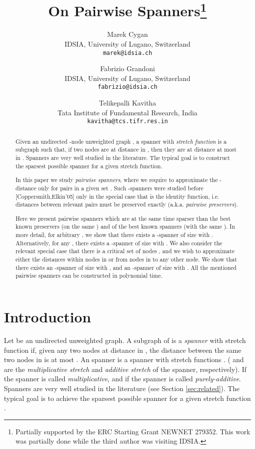 \documentclass[a4paper,11pt]{article}
\title{On Pairwise Spanners\footnote{Partially supported by the ERC Starting Grant NEWNET 279352. This work was partially done while the third author was visiting IDSIA.}}
\author{
 Marek Cygan \\
  IDSIA, University of Lugano, Switzerland \\
\small  \texttt{marek@idsia.ch}  \\
\and
Fabrizio Grandoni \\
  IDSIA, University of Lugano, Switzerland \\
\small   \texttt{fabrizio@idsia.ch}  \\
\and
Telikepalli Kavitha \\
Tata Institute of Fundamental Research, India \\
\small \texttt{kavitha@tcs.tifr.res.in}
}
\theoremstyle{definition}
\begin{document}
\maketitle

\begin{abstract}
Given an undirected -node unweighted graph , a spanner with \emph{stretch function}  is a subgraph  such that, if two nodes are at distance  in , then they are at distance at most  in . Spanners are very well studied in the literature. The typical goal is to construct the sparsest possible spanner for a given stretch function. 

In this paper we study \emph{pairwise spanners}, where we require to approximate the - distance 
only for pairs  in a given set .
Such -spanners were studied before [Coppersmith,Elkin'05] only in the special case that  is the identity function, i.e. distances between relevant pairs must be preserved exactly (a.k.a. {\em pairwise preservers}). 

Here we present pairwise spanners which are at the same time sparser than the best known preservers (on the same ) and of the best known spanners (with the same ).
In more detail, for arbitrary , we show that there exists a -spanner of size  with . Alternatively, for any , there exists a -spanner of size  with . We also consider the relevant special case that there is a critical set of nodes , and we wish to approximate either the distances within nodes in  or from nodes in  to any other node. We show that there exists an -spanner of size  with , and an -spanner of size  with . All the mentioned pairwise spanners can be constructed in polynomial time.
\end{abstract}





\section{Introduction}
\label{intro}

Let  be an undirected unweighted graph. A subgraph  of  is a \emph{spanner} with stretch function  if, given any two nodes  at distance  in , the distance  between the same two nodes in  is at most . An  spanner is a spanner with stretch functions . ( and  are the \emph{multiplicative stretch} and \emph{additive stretch} of the spanner, respectively). If  the spanner is called \emph{multiplicative}, and if  the spanner is called \emph{purely-additive}. 
Spanners are very well studied in the literature (see Section \ref{sec:related}). The typical goal is to achieve the sparsest possible spanner for a given stretch function  \cite{BKMP05,BS03,DHZ97,E05,EP04,HZ96,PS89,RZ04,RMZ05,TZ06}.
\end{document}
